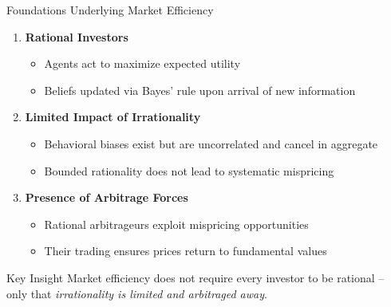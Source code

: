 \begin{frame}{Foundations Underlying Market Efficiency}
	
	\begin{enumerate}
		\item \textbf{Rational Investors}
		\begin{itemize}
			\item Agents act to maximize expected utility
			\item Beliefs updated via Bayes' rule upon arrival of new information
		\end{itemize}
		
		\vspace{0.2cm}
		\item \textbf{Limited Impact of Irrationality}
		\begin{itemize}
			\item Behavioral biases exist but are uncorrelated and cancel in aggregate
			\item Bounded rationality does not lead to systematic mispricing
		\end{itemize}
		
		\vspace{0.2cm}
		\item \textbf{Presence of Arbitrage Forces}
		\begin{itemize}
			\item Rational arbitrageurs exploit mispricing opportunities
			\item Their trading ensures prices return to fundamental values
		\end{itemize}
	\end{enumerate}
	
	\vspace{0.3cm}
	\begin{alertblock}{Key Insight}
		Market efficiency does not require every investor to be rational -- only that \textit{irrationality is limited and arbitraged away}.
	\end{alertblock}
	
\end{frame}

